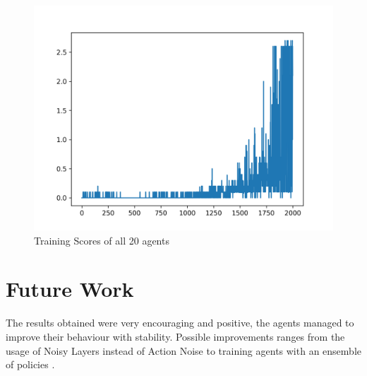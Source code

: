 \documentclass[letterpaper]{article}
\begin{document}
\begin{figure}[]
\includegraphics[width=\linewidth]{img/scores.png}
\caption{Training Scores of all 20 agents\label{fig:plot2}}
\end{figure}   

\section{Future Work}

The results obtained were very encouraging and positive, the agents managed to improve their behaviour with stability. Possible improvements ranges from the usage of Noisy Layers instead of Action Noise \cite{fortunato2017noisy} to  training agents with an ensemble of policies \cite{lowe2017multi}.




\end{document}
